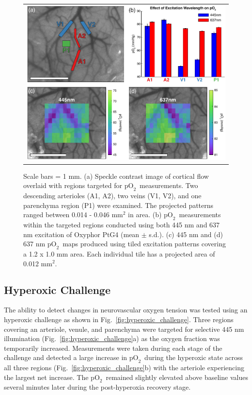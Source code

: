 \documentclass[12pt]{spieman}  %
\newcommand{\pO}{\ensuremath{\text{pO}_2}}
\begin{document}
\begin{spacing}{2}
\begin{figure}
    \begin{center}
        \begin{tabular}{c}
            \includegraphics[width=6.25in]{Figure3.pdf}
        \end{tabular}
    \end{center}
    \caption {
        \label{fig:static_oxygen}
        Scale bars = 1 mm. (a) Speckle contrast image of cortical flow overlaid with regions targeted for \pO\ measurements. Two descending arterioles (A1, A2), two veins (V1, V2), and one parenchyma region (P1) were examined. The projected patterns ranged between 0.014 - 0.046 mm$^2$ in area. (b) \pO\ measurements within the targeted regions conducted using both 445 nm and 637 nm excitation of Oxyphor PtG4 (mean $\pm$ s.d.). (c) 445 nm and (d) 637 nm \pO\ maps produced using tiled excitation patterns covering a 1.2 x 1.0 mm area. Each individual tile has a projected area of 0.012 mm$^2$.
    }
\end{figure}


\subsection{Hyperoxic Challenge}
The ability to detect changes in neurovascular oxygen tension was tested using an hyperoxic challenge as shown in Fig.~\ref{fig:hyperoxic_challenge}. Three regions covering an arteriole, venule, and parenchyma were targeted for selective 445 nm illumination (Fig.~\ref{fig:hyperoxic_challenge}a) as the oxygen fraction was temporarily increased. Measurements were taken during each stage of the challenge and detected a large increase in \pO\ during the hyperoxic state across all three regions (Fig.~\ref{fig:hyperoxic_challenge}b) with the arteriole experiencing the largest net increase. The \pO\ remained slightly elevated above baseline values several minutes later during the post-hyperoxia recovery stage.


\end{spacing}
\end{document}
